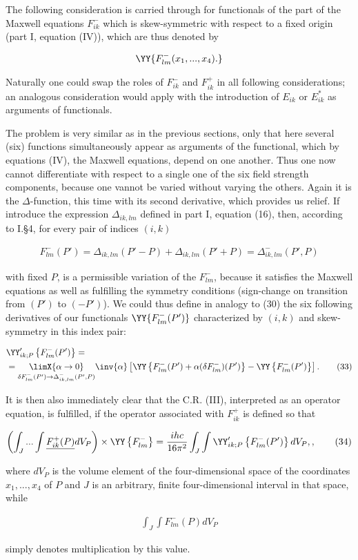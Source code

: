 \documentclass{article}
\newcommand{\nequ}[2]{
\begin{align*}
#1
\tag{#2}
\end{align*}
}
\newcommand{\uequ}[1]{
\begin{align*}
#1
\end{align*}
}
\begin{document}
The following consideration is carried through for functionals of the part of the Maxwell equations  $F^-_{ik}$ which is skew-symmetric with respect to a fixed origin (part I, equation (IV)), which are thus denoted by
\uequ{
\YY\{F^-_{lm}(x_1,...,x_4).\}
}
Naturally one could swap the roles of $F^-_{ik}$ and $F^+_{ik}$ in all following considerations; an analogous consideration would apply with the introduction of $E_{ik}$ or $E^*_{ik}$ as arguments of functionals.

The problem is very similar as in the previous sections, only that here several (six) functions simultaneously appear as arguments of the functional, which by equations (IV), the Maxwell equations, depend on one another. Thus one now cannot differentiate with respect to a single one of the six field strength components, because one vannot be varied without varying the others. Again it is the $\Delta$-function, this time with its second derivative, which provides us relief. If introduce the expression $\Delta_{ik,lm}$ defined in part I, equation (16), then, according to I.§4, for every pair of indices $(i,k)$
\nequ{
F^-_{lm}(P') = \Delta_{ik,lm}(P'-P) + \Delta_{ik,lm}(P'+P) = \Delta^-_{ik,lm}(P',P)
}{32}
with fixed $P$, is a permissible variation of the $F^-_{lm}$, because it satisfies the Maxwell equations as well as fulfilling the symmetry conditions (sign-change on transition from $(P')$ to $(-P')$). We could thus define in analogy to (30) the six following derivatives of our functionals $\YY\{F^-_{lm}(P')\}$ characterized by $(i,k)$ and skew-symmetry in this index pair:
\nequ{
&\YY'_{ik;P}\left\{F^-_{lm}(P')\right\} = \\
&= \underset{\delta F^-_{lm}(P') \to \Delta^-_{ik,lm}(P',P)}{\limX{\alpha \to 0}}
\inv{\alpha}\left[\YY\left\{F^-_{lm}(P') +
\alpha(\delta F^-_{lm})(P')\right\} - \YY\left\{F^-_{lm}(P')\right\}
\right].
}{33}
It is then also immediately clear that the C.R. (III), interpreted as an operator equation, is fulfilled, if the operator associated with $F^+_{ik}$ is defined so that
\nequ{
\left(\int_J ... \int \underline{F^+_{ik}(P)}dV_P\right)\times\YY\left\{F^-_{lm}\right\} =
\frac{ihc}{16\pi^2}\int_J \int \YY'_{ik;P}\left\{F^-_{lm}(P')\right\}dV_P,
,}{34}
where $dV_P$ is the volume element of the four-dimensional space of the coordinates $x_1,...,x_4$ of $P$ and $J$ is an arbitrary, finite four-dimensional interval in that space, while
\uequ{
\int_J\int F^-_{lm}(P)dV_P
}
simply denotes multiplication by this value.
\end{document}
